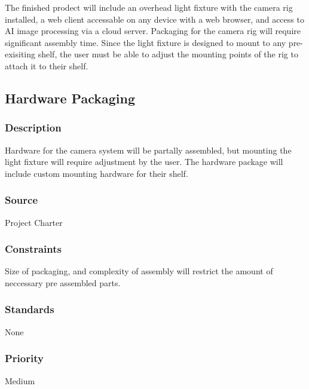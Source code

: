 
The finished prodect will include an overhead light fixture with the camera rig installed, a web client accessable on any device with a web browser, and access to AI image processing via a cloud server.
Packaging for the camera rig will require significant assembly time. Since the light fixture is designed to mount to any pre-exisiting shelf, the user must be able to adjust the mounting points of the rig to attach it to their shelf.


\subsection{Hardware Packaging}
\subsubsection{Description}
Hardware for the camera system will be partally assembled, but mounting the light fixture will require adjustment by the user.
The hardware package will include custom mounting hardware for their shelf.
\subsubsection{Source}
Project Charter
\subsubsection{Constraints}
Size of packaging, and complexity of assembly will restrict the amount of neccessary pre assembled parts.
\subsubsection{Standards}
None
\subsubsection{Priority}
Medium


